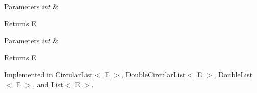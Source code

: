 \begin{DoxyParams}{Parameters}
{\em int} & \\
\hline
\end{DoxyParams}
\begin{DoxyReturn}{Returns}
E 
\end{DoxyReturn}

\begin{DoxyParams}{Parameters}
{\em int} & \\
\hline
\end{DoxyParams}
\begin{DoxyReturn}{Returns}
E 
\end{DoxyReturn}


Implemented in \hyperlink{classCircularList_ad6783339c7ff05841fc62f74f809644d}{Circular\-List$<$ E $>$}, \hyperlink{classDoubleCircularList_aa00bc8fd524af1ba208f85d8816dec52}{Double\-Circular\-List$<$ E $>$}, \hyperlink{classDoubleList_a230a8c9c574abe9c72f8daae35127d9c}{Double\-List$<$ E $>$}, and \hyperlink{classList_ab081a52d7a62aa6c5550ff9762f9427f}{List$<$ E $>$}.

